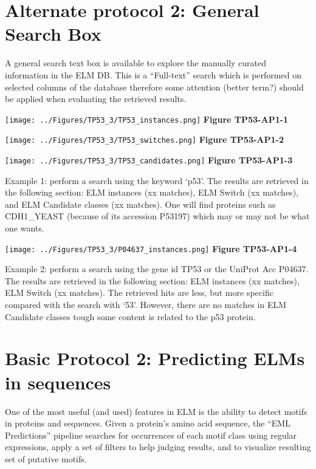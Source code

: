\section{Alternate protocol 2: General Search
Box}\label{alternate-protocol-2-general-search-box}

A general search text box is available to explore the manually curated
information in the ELM DB. This is a ``Full-text'' search which is
performed on selected columns of the database therefore some attention
(better term?) should be applied when evaluating the retrieved results.

\texttt{[image: ../Figures/TP53\_3/TP53\_instances.png]} \textbf{Figure
TP53-AP1-1}

\texttt{[image: ../Figures/TP53\_3/TP53\_switches.png]} \textbf{Figure
TP53-AP1-2}

\texttt{[image: ../Figures/TP53\_3/TP53\_candidates.png]} \textbf{Figure
TP53-AP1-3}

Example 1: perform a search using the keyword `p53'. The results are
retrieved in the following section: ELM instances (xx matches), ELM
Switch (xx matches), and ELM Candidate classes (xx matches). One will
find proteins such as CDH1\_YEAST (because of its accession P53197)
which may or may not be what one wants.

\texttt{[image: ../Figures/TP53\_3/P04637\_instances.png]} \textbf{Figure
TP53-AP1-4}

Example 2: perform a search using the gene id TP53 or the UniProt Acc
P04637. The results are retrieved in the following section: ELM
instances (xx matches), ELM Switch (xx matches). The retrieved hits are
less, but more specific compared with the search with `53'. However,
there are no matches in ELM Candidate classes tough some content is
related to the p53 protein.

\section{Basic Protocol 2: Predicting ELMs in
sequences}\label{basic-protocol-2-predicting-elms-in-sequences}

One of the most useful (and used) features in ELM is the ability to
detect motifs in proteins and sequences. Given a protein's amino acid
sequence, the ``EML Predictions'' pipeline searches for occurrences of
each motif class using regular expressions, apply a set of filters to
help judging results, and to visualize resulting set of putative motifs.

